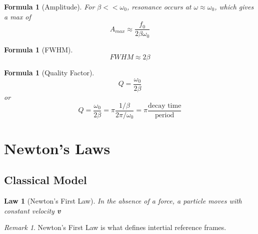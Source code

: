 \documentclass[12pt]{article}
\newtheorem{law}[thm]{Law}
\newtheorem{for}[thm]{Formula}
\theoremstyle{definition}
\theoremstyle{remark}
\newtheorem{rmk}[thm]{Remark}
\numberwithin{equation}{section}
\begin{document}
\begin{for}[Amplitude]
        For $\beta << \omega_0$, resonance occurs at $\omega \approx \omega_0$, which gives a max of \begin{equation}
                A_{max} \approx \frac{f_0}{2\beta\omega_0}
        \end{equation}
\end{for}


\vspace{15pt}

\begin{for}[FWHM]
        \begin{equation}
                FWHM \approx 2\beta
        \end{equation}
\end{for}


\vspace{15pt}

\begin{for}[Quality Factor]
        \begin{equation}
                Q = \frac{\omega_0}{2\beta}
        \end{equation}
        or \begin{equation}
                Q = \frac{\omega_0}{2\beta} = \pi\frac{1/\beta}{2\pi/\omega_0} = \pi\frac{\text{decay time}}{\text{period}}
        \end{equation}
\end{for}





\clearpage
\section{Newton's Laws}


\subsection{Classical Model}

\begin{law}[Newton's First Law]
        In the absence of a force, a particle moves with constant velocity \textbf{v}
\end{law}
\vspace{15pt}

\begin{rmk}
        Newton's First Law is what defines intertial reference frames.
\end{rmk}


\vspace{15pt}
\end{document}
